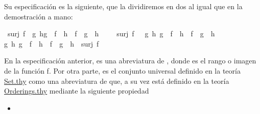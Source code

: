\begin{isabellebody}
\begin{isamarkuptext}
Su especificación es la siguiente, que la dividiremos en dos al igual que 
en la demostración a mano:%
\end{isamarkuptext}\isamarkuptrue%
\isamarkupfalse%
\isanewline
\ {\isachardoublequoteopen}surj\ f\ {\isasymlongleftrightarrow}\ {\isacharparenleft}{\isasymforall}g\ h{\isachardot}{\isacharparenleft}g\ {\isasymcirc}\ f\ {\isacharequal}\ h\ {\isasymcirc}\ f{\isacharparenright}\ {\isasymlongrightarrow}\ {\isacharparenleft}g\ {\isacharequal}\ h{\isacharparenright}{\isacharparenright}{\isachardoublequoteclose}\isanewline
%
\isadelimproof
\ \ %
\endisadelimproof
%
\isatagproof
{}\isamarkupfalse%
%
\endisatagproof
{\isafoldproof}%
%
\isadelimproof
\isanewline
%
\endisadelimproof
\isanewline
{}\isamarkupfalse%
\ \isanewline
{\isachardoublequoteopen}surj\ f\ {\isasymLongrightarrow}\ \ {\isacharparenleft}{\isasymforall}g\ h{\isachardot}\ {\isacharparenleft}g\ {\isasymcirc}\ f\ {\isacharequal}\ h\ {\isasymcirc}\ f{\isacharparenright}\ {\isasymlongrightarrow}\ {\isacharparenleft}g\ {\isacharequal}\ h{\isacharparenright}{\isacharparenright}{\isachardoublequoteclose}\isanewline
%
\isadelimproof
\ \ %
\endisadelimproof
%
\isatagproof
{}\isamarkupfalse%
%
\endisatagproof
{\isafoldproof}%
%
\isadelimproof
\isanewline
%
\endisadelimproof
\isanewline
{}\isamarkupfalse%
\ \isanewline
{\isachardoublequoteopen}{\isasymforall}g\ h{\isachardot}\ {\isacharparenleft}g\ {\isasymcirc}\ f\ {\isacharequal}\ h\ {\isasymcirc}\ f\ {\isasymlongrightarrow}\ g\ {\isacharequal}\ h{\isacharparenright}\ {\isasymlongrightarrow}\ surj\ f{\isachardoublequoteclose}\isanewline
%
\isadelimproof
\ \ %
\endisadelimproof
%
\isatagproof
{}\isamarkupfalse%
%
\endisatagproof
{\isafoldproof}%
%
\isadelimproof
%
\endisadelimproof
%
\begin{isamarkuptext}%
En la especificación anterior,  es una abreviatura de 
  , donde  es el rango o imagen
de la función f.
 Por otra parte,  es el conjunto universal definido en la 
  teoría \href{http://bit.ly/2XtHCW6}{Set.thy} como una abreviatura de 
   que, a su vez está definido en la teoría 
  \href{http://bit.ly/2Xyj9Pe}{Orderings.thy} mediante la siguiente
  propiedad 
  \begin{itemize}
    \item[]  

\end{itemize}
\end{isamarkuptext}
\end{isabellebody}
